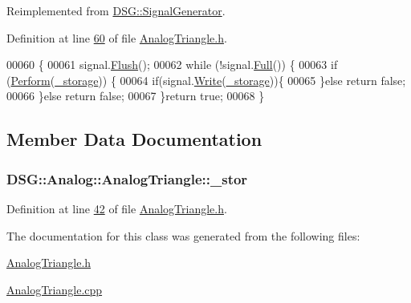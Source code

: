 Reimplemented from \hyperlink{class_d_s_g_1_1_signal_generator_ab050f80e84e6c8b3e354b56930d6a02b}{D\+S\+G\+::\+Signal\+Generator}.



Definition at line \hyperlink{_analog_triangle_8h_source_l00060}{60} of file \hyperlink{_analog_triangle_8h_source}{Analog\+Triangle.\+h}.


\begin{DoxyCode}
00060                                                                          \{
00061             signal.\hyperlink{class_d_s_g_1_1_ring_buffer_ab23c8003d2857809a816068eeb209d60}{Flush}();
00062             \textcolor{keywordflow}{while} (!signal.\hyperlink{class_d_s_g_1_1_ring_buffer_a53ddb04ffcbb5470a8d2b0a3c65b70cb}{Full}()) \{
00063                 \textcolor{keywordflow}{if} (\hyperlink{class_d_s_g_1_1_analog_1_1_analog_triangle_a9b2484f3eb4c4ad545cb88b8833be124}{Perform}(\hyperlink{class_d_s_g_1_1_signal_generator_a28a9b47a1aa0783029f11a19ba0363f2}{\_storage})) \{
00064                     \textcolor{keywordflow}{if}(signal.\hyperlink{class_d_s_g_1_1_ring_buffer_aa5dd2caa0a270173251faee40a43d692}{Write}(\hyperlink{class_d_s_g_1_1_signal_generator_a28a9b47a1aa0783029f11a19ba0363f2}{\_storage}))\{
00065                     \}\textcolor{keywordflow}{else} \textcolor{keywordflow}{return} \textcolor{keyword}{false};
00066                 \}\textcolor{keywordflow}{else} \textcolor{keywordflow}{return} \textcolor{keyword}{false};
00067             \}\textcolor{keywordflow}{return} \textcolor{keyword}{true};
00068         \}
\end{DoxyCode}


\subsection{Member Data Documentation}
\hypertarget{class_d_s_g_1_1_analog_1_1_analog_triangle_ac93bccb7e366491f45ea9c3af04072ae}{
\subsubsection[{\+\_\+stor}]{ D\+S\+G\+::\+Analog\+::\+Analog\+Triangle\+::\+\_\+stor\hspace{0.3cm}{\ttfamily [protected]}}}\label{class_d_s_g_1_1_analog_1_1_analog_triangle_ac93bccb7e366491f45ea9c3af04072ae}


Definition at line \hyperlink{_analog_triangle_8h_source_l00042}{42} of file \hyperlink{_analog_triangle_8h_source}{Analog\+Triangle.\+h}.



The documentation for this class was generated from the following files\+:\begin{DoxyCompactItemize}
\item 
\hyperlink{_analog_triangle_8h}{Analog\+Triangle.\+h}\item 
\hyperlink{_analog_triangle_8cpp}{Analog\+Triangle.\+cpp}\end{DoxyCompactItemize}
